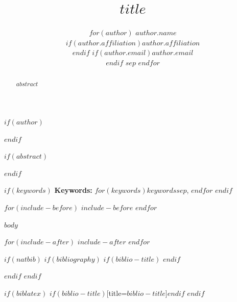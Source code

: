 \documentclass[11pt]{article}
\begin{document}
\title{$title$}

$if(author)$
\author{
$for(author)$
$author.name$ \\
$if(author.affiliation)$$author.affiliation$ \\$endif$
$if(author.email)$\texttt{$author.email$} \\$endif$
$sep$\And
$endfor$
}
$endif$

\maketitle

$if(abstract)$
\begin{abstract}
$abstract$
\end{abstract}
$endif$

$if(keywords)$
{\bf Keywords:} $for(keywords)$$keywords$$sep$, $endfor$
\vspace{0.5em}
$endif$

$for(include-before)$
$include-before$
$endfor$

$body$

$for(include-after)$
$include-after$
$endfor$

$if(natbib)$
$if(bibliography)$
$if(biblio-title)$
\renewcommand\refname{$biblio-title$}
$endif$
  
$endif$
$endif$

$if(biblatex)$
\printbibliography$if(biblio-title)$[title=$biblio-title$]$endif$
$endif$
\end{document}
